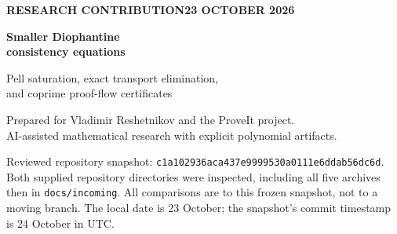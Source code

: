 \documentclass[11pt]{article}
\theoremstyle{definition}
\theoremstyle{remark}
\newcommand{\file}[1]{\nolinkurl{#1}}
\newcommand{\pin}{\texttt{c1a102936aca437e9999530a0111e6ddab56dc6d}}
\begin{document}
\thispagestyle{empty}
{\sffamily\bfseries\color{accent}RESEARCH CONTRIBUTION\hfill 23 OCTOBER 2026\par}
\vspace{0.65cm}
{\Huge\bfseries\color{ink}Smaller Diophantine\\[4pt]consistency equations\par}
\vspace{0.35cm}
{\Large Pell saturation, exact transport elimination,\\and coprime proof-flow certificates\par}
\vspace{0.4cm}
Prepared for Vladimir Reshetnikov and the ProveIt project.\\
AI-assisted mathematical research with explicit polynomial artifacts.

\begin{abstract}
We improve two different parts of the current ProveIt frontier. A transport
coordinate change, already available in an earlier source but not applied to
the newest joint-sign family, gives one polynomial in \textbf{18 unrestricted
integers}, of exact degree \textbf{88}, evaluated in \textbf{105} binary
arithmetic operations. Its predecessor has 19 variables and 109 operations.
Three companion projections improve the variable counts at degrees 32, 20,
and 16 as well.

A separate Pell-certificate reduction removes a redundant factor from its
strong ordinate. The square root needed to restore that factor is already
certified by another part of the same equation. This gives a
\textbf{nine-positive-variable} polynomial of degree \textbf{\CheapDegree}
in \textbf{\CheapOps} operations, improving the current 440-operation,
degree-1,845,940 construction in both measures. A complete-radical majorant
gives another nine-variable point of degree \textbf{\RadicalDegree} in
\textbf{\RadicalOps} operations. All fixed coefficients and ordinary
division-free evaluation circuits are supplied.

The new existence equivalences are proved with explicit reverse maps. Their
consistency interpretation composes with the precisely pinned ordinary
native/compiler and syntactic-refutation calibration theorems. We do not
claim a new end-to-end Lean/Rocq certificate, a completed derivation in the
repository's encoded object-language ZFC, or global minimality. A distinct
Fermat-label proof-flow construction removes acyclicity and common-multiple
parameters at the finite-certificate level; its final fixed-dimensional
Diophantine closure remains open and is not counted as a finished equation.
\end{abstract}
\vfill
\small
Reviewed repository snapshot: \pin.\\
Both supplied repository directories were inspected, including all five
archives then in \file{docs/incoming}. All comparisons are to this frozen
snapshot, not to a moving branch. The local date is 23 October; the snapshot's
commit timestamp is 24 October in UTC.
\newpage
\normalsize
\tableofcontents
\newpage
\end{document}
